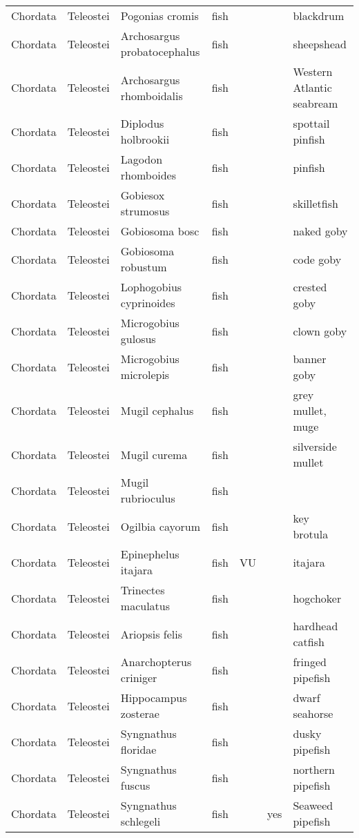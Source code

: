 \begin{longtable}{lllllll}
  Chordata & Teleostei & Pogonias cromis & fish &  &  & blackdrum \\ 
  Chordata & Teleostei & Archosargus probatocephalus & fish &  &  & sheepshead \\ 
  Chordata & Teleostei & Archosargus rhomboidalis & fish &  &  & Western Atlantic seabream \\ 
  Chordata & Teleostei & Diplodus holbrookii & fish &  &  & spottail pinfish \\ 
  Chordata & Teleostei & Lagodon rhomboides & fish &  &  & pinfish \\ 
  Chordata & Teleostei & Gobiesox strumosus & fish &  &  & skilletfish \\ 
  Chordata & Teleostei & Gobiosoma bosc & fish &  &  & naked goby \\ 
  Chordata & Teleostei & Gobiosoma robustum & fish &  &  & code goby \\ 
  Chordata & Teleostei & Lophogobius cyprinoides & fish &  &  & crested goby \\ 
  Chordata & Teleostei & Microgobius gulosus & fish &  &  & clown goby \\ 
  Chordata & Teleostei & Microgobius microlepis & fish &  &  & banner goby \\ 
  Chordata & Teleostei & Mugil cephalus & fish &  &  & grey mullet, muge \\ 
  Chordata & Teleostei & Mugil curema & fish &  &  & silverside mullet \\ 
  Chordata & Teleostei & Mugil rubrioculus & fish &  &  &  \\ 
  Chordata & Teleostei & Ogilbia cayorum & fish &  &  & key brotula \\ 
  Chordata & Teleostei & Epinephelus itajara & fish & VU &  & itajara \\ 
  Chordata & Teleostei & Trinectes maculatus & fish &  &  & hogchoker \\ 
  Chordata & Teleostei & Ariopsis felis & fish &  &  & hardhead catfish \\ 
  Chordata & Teleostei & Anarchopterus criniger & fish &  &  & fringed pipefish \\ 
  Chordata & Teleostei & Hippocampus zosterae & fish &  &  & dwarf seahorse \\ 
  Chordata & Teleostei & Syngnathus floridae & fish &  &  & dusky pipefish \\ 
  Chordata & Teleostei & Syngnathus fuscus & fish &  &  & northern pipefish \\ 
  Chordata & Teleostei & Syngnathus schlegeli & fish &  & yes & Seaweed pipefish \\ 

\end{longtable}
